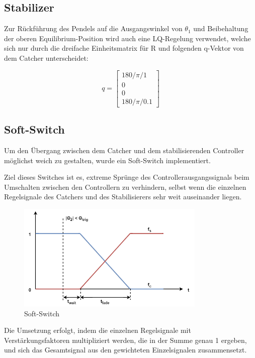 \subsection{Stabilizer}
\label{stabilizer} 

Zur Rückführung des Pendels auf die Ausgangswinkel von $\theta_1$ und Beibehaltung der oberen Equilibrium-Position wird auch eine LQ-Regelung verwendet, welche sich nur durch die dreifache Einheitsmatrix für R und folgenden q-Vektor von dem Catcher unterscheidet:

\begin{equation}
q =\begin{bmatrix}
         180/\pi/1 \\
         0\\
         0\\
         180/\pi/0.1
        \end{bmatrix}
\end{equation}

\subsection{Soft-Switch}
Um den Übergang zwischen dem Catcher und dem stabilisierenden Controller möglichst weich zu gestalten, wurde ein Soft-Switch implementiert.

Ziel dieses Switches ist es, extreme Sprünge des Controllerausgangssignals beim Umschalten zwischen den Controllern zu verhindern, selbst wenn die einzelnen Regelsignale des Catchers und des Stabilisierers sehr weit auseinander liegen.

\begin{figure}[htbp]
	\centering	
	\label{fig.Soft-Switch}
	\includegraphics[width=0.8\textwidth]{Grafiken/SoftSwitch.png}
	\caption{Soft-Switch}
\end{figure}

Die Umsetzung erfolgt, indem die einzelnen Regelsignale mit Verstärkungsfaktoren multipliziert werden, die in der Summe genau 1 ergeben, und sich das Gesamtsignal aus den gewichteten Einzelsignalen zusammensetzt.

